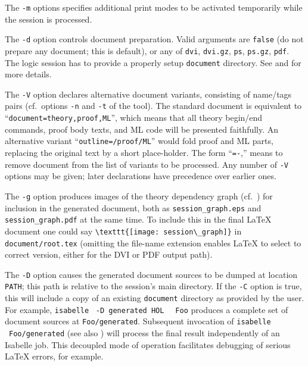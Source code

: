 \begin{isabellebody}
\begin{isamarkuptext}
  The \verb|-m| options specifies additional print modes to be
  activated temporarily while the session is processed.

  \medskip The \verb|-d| option controls document preparation.
  Valid arguments are \verb|false| (do not prepare any document;
  this is default), or any of \verb|dvi|, \verb|dvi.gz|,
  \verb|ps|, \verb|ps.gz|, \verb|pdf|.  The logic
  session has to provide a properly setup \verb|document|
  directory.  See  and
   for more details.

  \medskip The \verb|-V| option declares alternative document
  variants, consisting of name/tags pairs (cf.\ options \verb|-n| and \verb|-t| of the \hyperlink{tool.document}{\mbox{}} tool).  The
  standard document is equivalent to ``\verb|document=theory,proof,ML|'', which means that all theory begin/end
  commands, proof body texts, and ML code will be presented
  faithfully.  An alternative variant ``\verb|outline=/proof/ML|'' would fold proof and ML parts, replacing the
  original text by a short place-holder.  The form ``\verb|=-|,'' means to remove document  from
  the list of variants to be processed.  Any number of \verb|-V| options may be given; later declarations have precedence over
  earlier ones.

  \medskip The \verb|-g| option produces images of the theory
  dependency graph (cf.\ ) for inclusion in the
  generated document, both as \verb|session_graph.eps| and
  \verb|session_graph.pdf| at the same time.  To include this in
  the final {\LaTeX} document one could say \verb|\texttt{[image: session\_graph]}| in \verb|document/root.tex| (omitting the file-name extension enables
  {\LaTeX} to select to correct version, either for the DVI or PDF
  output path).

  \medskip The \verb|-D| option causes the generated document
  sources to be dumped at location \verb|PATH|; this path is
  relative to the session's main directory.  If the \verb|-C|
  option is true, this will include a copy of an existing \verb|document| directory as provided by the user.  For example,
  \verb|isabelle| \hyperlink{tool.usedir}{\mbox{}}~\verb|-D generated HOL|\isasep\isanewline%
\verb|  Foo| produces a complete set of document sources at \verb|Foo/generated|.  Subsequent invocation of \verb|isabelle| \hyperlink{tool.document}{\mbox{}}~\verb|Foo/generated| (see also
  ) will process the final result
  independently of an Isabelle job.  This decoupled mode of operation
  facilitates debugging of serious {\LaTeX} errors, for example.


\end{isamarkuptext}
\end{isabellebody}
